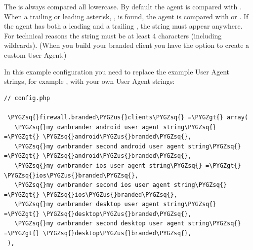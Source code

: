 \documentclass[letterpaper,10pt,english]{sphinxmanual}
\def\PYGZus{\char`\_}
\def\PYGZgt{\char`\>}
\def\PYGZsq{\char`\'}
\begin{document}
The  is always compared all lowercase. By default the agent is
compared with . When a trailing or leading asterisk, \code{*}, is found,
the agent is compared with  or . If the agent has
both a leading and a trailing \code{*}, the string must appear anywhere. For
technical reasons the  string must be at least 4 characters
(including wildcards). (When you build your branded client you have the option
to create a custom User Agent.)

In this example configuration you need to replace the example User Agent
strings, for example , with your own User Agent strings:

\begin{Verbatim}[commandchars=\\\{\}]
// config.php

 \PYGZsq{}firewall.branded\PYGZus{}clients\PYGZsq{} =\PYGZgt{} array(
   \PYGZsq{}my ownbrander android user agent string\PYGZsq{} =\PYGZgt{} \PYGZsq{}android\PYGZus{}branded\PYGZsq{},
   \PYGZsq{}my ownbrander second android user agent string\PYGZsq{} =\PYGZgt{} \PYGZsq{}android\PYGZus{}branded\PYGZsq{},
   \PYGZsq{}my ownbrander ios user agent string\PYGZsq{} =\PYGZgt{} \PYGZsq{}ios\PYGZus{}branded\PYGZsq{},
   \PYGZsq{}my ownbrander second ios user agent string\PYGZsq{} =\PYGZgt{} \PYGZsq{}ios\PYGZus{}branded\PYGZsq{},
   \PYGZsq{}my ownbrander desktop user agent string\PYGZsq{} =\PYGZgt{} \PYGZsq{}desktop\PYGZus{}branded\PYGZsq{},
   \PYGZsq{}my ownbrander second desktop user agent string\PYGZsq{} =\PYGZgt{} \PYGZsq{}desktop\PYGZus{}branded\PYGZsq{},
 ),
\end{Verbatim}
\end{document}
